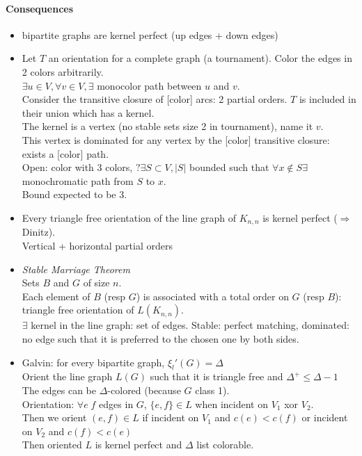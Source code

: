 \documentclass[12pt]{article}
\begin{document}
\paragraph{Consequences}
\begin{itemize}
\item bipartite graphs are kernel perfect (up edges + down edges)
\item Let $T$ an orientation for a complete graph (a tournament). Color the edges in 2 colors arbitrarily.\\
	$\exists u \in V, \forall v \in V, \exists$ monocolor path between $u$ and $v$.\\
	Consider the transitive closure of [color] arcs: 2 partial orders. $T$ is included in their union which has a kernel.\\
	The kernel is a vertex (no stable sets size 2 in tournament), name it $v$.\\
	This vertex is dominated for any vertex by the [color] transitive closure: exists a [color] path.\\
	Open: color with 3 colors, $? \exists S \subset V, |S|$ bounded such that $\forall x \notin S \exists$ monochromatic path from $S$ to $x$.\\
	Bound expected to be $3$.\\
\item Every triangle free orientation of the line graph of $K_{n,n}$ is kernel perfect ($\Rightarrow$ Dinitz).\\
	Vertical + horizontal partial orders
\item \emph{Stable Marriage Theorem}\\
	Sets $B$ and $G$ of size $n$.\\
	Each element of $B$ (resp $G$) is associated with a total order on $G$ (resp $B$): triangle free orientation of $L(K_{n,n})$.\\
	$\exists$ kernel in the line graph: set of edges. Stable: perfect matching, dominated: no edge such that it is preferred to the chosen one by both sides.
\item Galvin: for every bipartite graph, $\xi_l'(G) = \Delta$\\
	Orient the line graph $L(G)$ such that it is triangle free and $\Delta^+ \leqslant \Delta - 1$\\
	The edges can be $\Delta$-colored (because $G$ class 1).\\
	Orientation: $\forall e \; f$ edges in $G$, $\{e,f\} \in L$ when incident on $V_1$ xor $V_2$.\\
	Then we orient $(e,f) \in L$ if incident on $V_1$ and $c(e) < c(f)$ or incident on $V_2$ and $c(f) < c(e)$\\
	Then oriented $L$ is kernel perfect and $\Delta$ list colorable.
\end{itemize}
\end{document}
